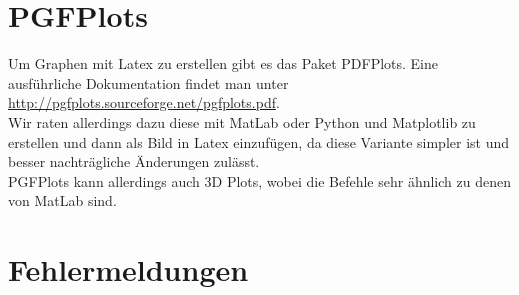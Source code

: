 		
		
	\newpage
	\section{PGFPlots}
	Um Graphen mit Latex zu erstellen gibt es das Paket PDFPlots. Eine ausführliche Dokumentation findet man unter \url{http://pgfplots.sourceforge.net/pgfplots.pdf}.\\
	 Wir raten allerdings dazu diese mit MatLab oder Python und Matplotlib zu erstellen und dann als Bild in Latex einzufügen, da diese Variante simpler ist und besser nachträgliche Änderungen zulässt.\\
	 PGFPlots kann allerdings auch 3D Plots, wobei die Befehle sehr ähnlich zu denen von MatLab sind.
	
	
	\newpage
	\section{Fehlermeldungen}
	
	\newpage
	\printbibliography
	

